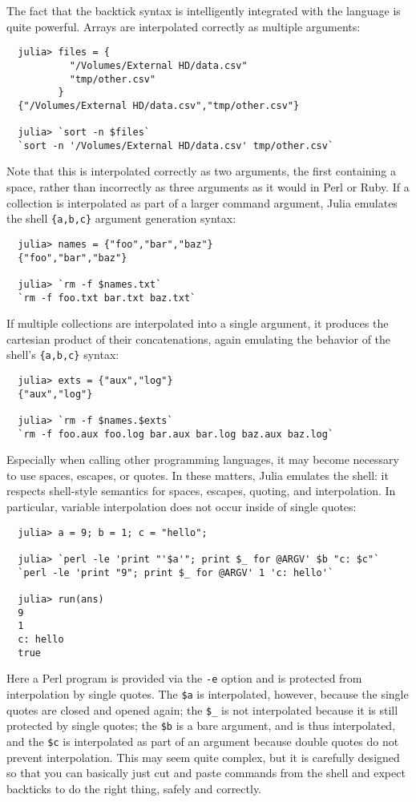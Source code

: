 \documentclass{article}
\begin{document}
The fact that the backtick syntax is intelligently integrated with the language is quite powerful.
Arrays are interpolated correctly as multiple arguments:
\begin{verbatim}
  julia> files = {
           "/Volumes/External HD/data.csv"
           "tmp/other.csv"
         }
  {"/Volumes/External HD/data.csv","tmp/other.csv"}

  julia> `sort -n $files`
  `sort -n '/Volumes/External HD/data.csv' tmp/other.csv`
\end{verbatim}
Note that this is interpolated correctly as two arguments, the first containing a space, rather than incorrectly as three arguments as it would in Perl or Ruby.
If a collection is interpolated as part of a larger command argument, Julia emulates the shell \verb|{a,b,c}| argument generation syntax:
\begin{verbatim}
  julia> names = {"foo","bar","baz"}
  {"foo","bar","baz"}

  julia> `rm -f $names.txt`
  `rm -f foo.txt bar.txt baz.txt`
\end{verbatim}
If multiple collections are interpolated into a single argument, it produces the cartesian product of their concatenations, again emulating the behavior of the shell's \verb|{a,b,c}| syntax:
\begin{verbatim}
  julia> exts = {"aux","log"}
  {"aux","log"}

  julia> `rm -f $names.$exts`
  `rm -f foo.aux foo.log bar.aux bar.log baz.aux baz.log`
\end{verbatim}

Especially when calling other programming languages, it may become necessary to use spaces, escapes, or quotes.
In these matters, Julia emulates the shell:
it respects shell-style semantics for spaces, escapes, quoting, and interpolation.
In particular, variable interpolation does not occur inside of single quotes:
\begin{verbatim}
  julia> a = 9; b = 1; c = "hello";

  julia> `perl -le 'print "'$a'"; print $_ for @ARGV' $b "c: $c"`
  `perl -le 'print "9"; print $_ for @ARGV' 1 'c: hello'`

  julia> run(ans)
  9
  1
  c: hello
  true
\end{verbatim}
Here a Perl program is provided via the \verb|-e| option and is protected from interpolation by single quotes.
The \verb|$a| is interpolated, however, because the single quotes are closed and opened again;
the \verb|$_| is not interpolated because it is still protected by single quotes;
the \verb|$b| is a bare argument, and is thus interpolated, and the \verb|$c| is interpolated as part of an argument because double quotes do not prevent interpolation.
This may seem quite complex, but it is carefully designed so that you can basically just cut and paste commands from the shell and expect backticks to do the right thing, safely and correctly.
\end{document}
